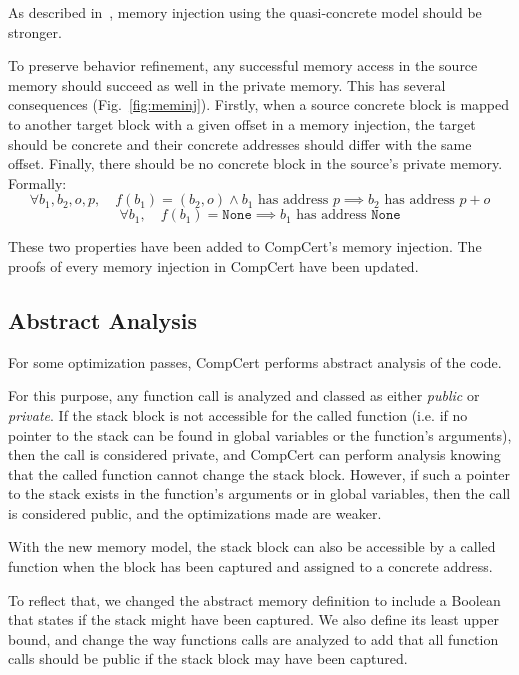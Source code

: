 As described in~\cite{DBLP:conf/pldi/KangHMGZV15}, memory injection using the quasi-concrete model should be stronger.

To preserve behavior refinement, any successful memory access in the source memory should succeed as well in the private memory. This has several consequences (Fig.~\ref{fig:meminj}).
Firstly, when a source concrete block is mapped to another target block with a given offset in a memory injection, the target should be concrete and their concrete addresses should differ with the same offset.
Finally, there should be no concrete block in the source's private memory.
Formally:
$$\forall b_1,b_2,o,p,\quad f(b_1)=(b_2,o)\wedge b_1\text{ has address }p\implies b_2\text{ has address }p+o$$
$$\forall b_1,\quad f(b_1)=\texttt{None}\implies b_1\text{ has address }\texttt{None}$$

These two properties have been added to CompCert's memory injection. The proofs of every memory injection in CompCert have been updated. 

\subsection{Abstract Analysis}

For some optimization passes, CompCert performs abstract analysis of the code.

For this purpose, any function call is analyzed and classed as either \textit{public} or \textit{private}. If the stack block is not accessible for the called function (i.e. if no pointer to the stack can be found in global variables or the function's arguments), then the call is considered private, and CompCert can perform analysis knowing that the called function cannot change the stack block. However, if such a pointer to the stack exists in the function's arguments or in global variables, then the call is considered public, and the optimizations made are weaker.

With the new memory model, the stack block can also be accessible by a called function when the block has been captured and assigned to a concrete address.

To reflect that, we changed the abstract memory definition to include a Boolean that states if the stack might have been captured. We also define its least upper bound, and change the way functions calls are analyzed to add that all function calls should be public if the stack block may have been captured.


